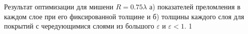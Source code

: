 \documentclass[14pt]{beamer}
\begin{document}
\begin{frame}
\begin{center}
\begin{minipage}[ht]{0.49\linewidth}
  \end{minipage}
  
  Результат оптимизации  для мишени ${R = 0.75\lambda}$ а) показателей преломления в каждом
    слое при его фиксированной толщине и б) толщины каждого слоя для
    покрытий с чередующимися слоями из большого $\varepsilon$ и
    ${\varepsilon<1}$.
1\end{center}
\end{frame}
\end{document}
